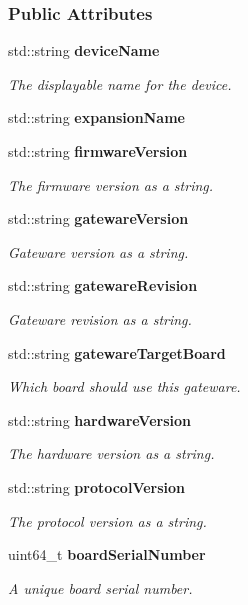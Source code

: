 \subsubsection*{Public Attributes}
\begin{DoxyCompactItemize}
\item 
std\+::string {\bf device\+Name}
\begin{DoxyCompactList}\small\item\em The displayable name for the device. \end{DoxyCompactList}\item 
std\+::string {\bf expansion\+Name}
\item 
std\+::string {\bf firmware\+Version}
\begin{DoxyCompactList}\small\item\em The firmware version as a string. \end{DoxyCompactList}\item 
std\+::string {\bf gateware\+Version}
\begin{DoxyCompactList}\small\item\em Gateware version as a string. \end{DoxyCompactList}\item 
std\+::string {\bf gateware\+Revision}
\begin{DoxyCompactList}\small\item\em Gateware revision as a string. \end{DoxyCompactList}\item 
std\+::string {\bf gateware\+Target\+Board}
\begin{DoxyCompactList}\small\item\em Which board should use this gateware. \end{DoxyCompactList}\item 
std\+::string {\bf hardware\+Version}
\begin{DoxyCompactList}\small\item\em The hardware version as a string. \end{DoxyCompactList}\item 
std\+::string {\bf protocol\+Version}
\begin{DoxyCompactList}\small\item\em The protocol version as a string. \end{DoxyCompactList}\item 
uint64\+\_\+t {\bf board\+Serial\+Number}
\begin{DoxyCompactList}\small\item\em A unique board serial number. \end{DoxyCompactList}\end{DoxyCompactItemize}


